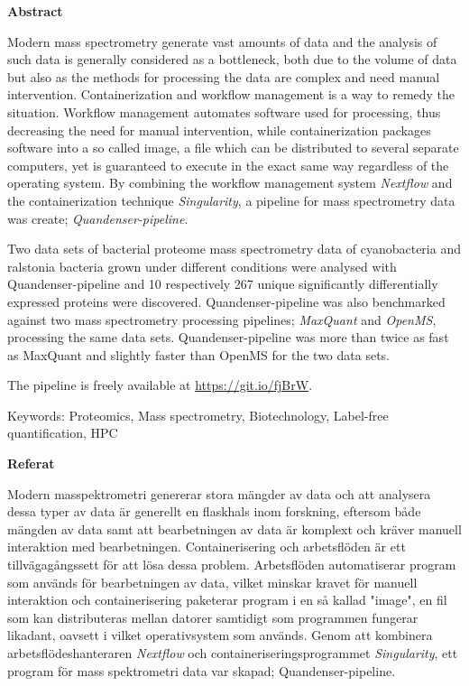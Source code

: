 \begin{center}\normalfont\Large\bfseries\centering Abstract\end{center}
Modern mass spectrometry generate vast amounts of data and the analysis of such data is generally considered as a bottleneck, both due to the volume of data but also as the methods for processing the data are complex and need manual intervention. Containerization and workflow management is a way to remedy the situation. Workflow management automates software used for processing, thus decreasing the need for manual intervention, while containerization packages software into a so called image, a file which can be distributed to several separate computers, yet is guaranteed to execute in the exact same way regardless of the operating system. By combining the workflow management system \textit{Nextflow} and the containerization technique \textit{Singularity}, a pipeline for mass spectrometry data was create; \textit{Quandenser-pipeline}.

Two data sets of bacterial proteome mass spectrometry data of cyanobacteria and ralstonia bacteria grown under different conditions were analysed with Quandenser-pipeline and 10 respectively 267 unique significantly differentially expressed proteins were discovered. Quandenser-pipeline was also benchmarked against two mass spectrometry processing pipelines; \textit{MaxQuant} and \textit{OpenMS}, processing the same data sets. Quandenser-pipeline was more than twice as fast as MaxQuant and slightly faster than OpenMS for the two data sets.

The pipeline is freely available at \url{https://git.io/fjBrW}.

\vspace{2cm}

Keywords: Proteomics, Mass spectrometry, Biotechnology, Label-free quantification, HPC

\newpage

\begin{center}\normalfont\Large\bfseries\centering Referat\end{center}
Modern masspektrometri genererar stora mängder av data och att analysera dessa typer av data är generellt en flaskhals inom forskning, eftersom både mängden av data samt att bearbetningen av data är komplext och kräver manuell interaktion med bearbetningen. Containerisering och arbetsflöden är ett tillvägagångssett för att lösa dessa problem. Arbetsflöden automatiserar program som används för bearbetningen av data, vilket minskar kravet för manuell interaktion och containerisering paketerar program i en så kallad "image", en fil som kan distributeras mellan datorer samtidigt som programmen fungerar likadant, oavsett i vilket operativsystem som används. Genom att kombinera arbetsflödeshanteraren \textit{Nextflow} och containeriseringsprogrammet \textit{Singularity}, ett program för mass spektrometri data var skapad; Quandenser-pipeline.

